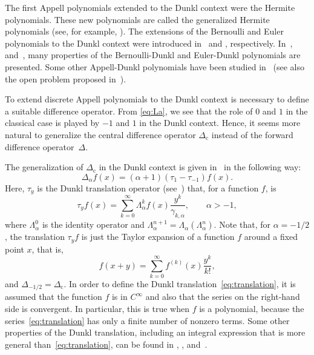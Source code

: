 \documentclass[11pt]{article}
\theoremstyle{plain}
\theoremstyle{remark}
\numberwithin{equation}{section} %
\newcommand{\La}{\Lambda_{\alpha}}
\begin{document}
The first Appell polynomials extended to the Dunkl context were the Hermite polynomials. These new polynomials are called the generalized Hermite polynomials (see, for example, \cite{AlS, Ros}). The extensions of the Bernoulli and Euler polynomials to the Dunkl context were introduced in~\cite{CDPV} and \cite{DPV}, respectively. In~\cite{CMV}, \cite{GV} and~\cite{MV}, many properties of the Bernoulli-Dunkl and Euler-Dunkl polynomials are presented. Some other Appell-Dunkl polynomials have been studied in~\cite{JMC} (see also the open problem proposed in~\cite[\S\,7]{GV2}).

To extend discrete Appell polynomials to the Dunkl context is necessary to define a suitable difference operator. From \eqref{eq:La}, we see that the role of $0$ and $1$ in the classical case is played by $-1$ and $1$ in the Dunkl context. Hence, it seems more natural to generalize the central difference operator $\Delta_{\mathrm{c}}$ instead of the forward difference operator~$\Delta$.

The generalization of $\Delta_{\mathrm{c}}$ in the Dunkl context is given in~\cite{ELMV} in the following way:
\[
  \Delta_{\alpha}f(x) = (\alpha+1)(\tau_1-\tau_{-1})f(x).
\]
Here, $\tau_y$ is the Dunkl translation operator (see~\cite{Ros}) that, for a function $f$, is 
\begin{equation}
\label{eq:translation}
  \tau_y f(x) = \sum_{k=0}^\infty \La^{k}f(x) \frac{y^k}{\gamma_{k,\alpha}},
  \qquad \alpha>-1,
\end{equation}
where $\La^0$ is the identity operator and $\La^{n+1} = \La(\La^n)$. 
Note that, for $\alpha=-1/2$, the translation $\tau_y f$ is just the Taylor expansion of a function $f$ around a fixed point $x$, that is,
\[
  f(x+y) = \sum_{k=0}^\infty f^{(k)}(x) \frac{y^k}{k!},
\]
and $\Delta_{-1/2}=\Delta_{\mathrm{c}}$. In order to define the Dunkl translation~\eqref{eq:translation}, it is assumed that the function $f$ is in $C^{\infty}$ and also that the series on the right-hand side is convergent. In particular, this is true when $f$ is a polynomial, because the series~\eqref{eq:translation} has only a finite number of nonzero terms. Some other properties of the Dunkl translation, including an integral expression that is more general than~\eqref{eq:translation}, can be found in \cite{Ros}, \cite{Rosler03}, and~\cite{ThX}.
\end{document}
